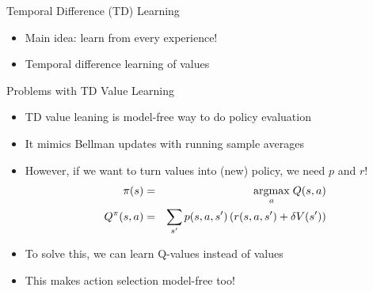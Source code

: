 \documentclass[11pt,aspectratio=169]{beamer}
\begin{document}
  
  \begin{frame}{Temporal Difference (TD) Learning}
   \begin{itemize}[<+->]
   \setlength{\itemsep}{0.7em}
    \item Main idea: learn from every experience!
    \item Temporal difference learning of values
   \end{itemize}
  \end{frame}
  
  
  \begin{frame}{Problems with TD Value Learning}
   \begin{itemize}
   \setlength{\itemsep}{1em}
    \item TD value leaning is model-free way to do policy evaluation
    \item It mimics Bellman updates with running sample averages
    \item However, if we want to turn values into (new) policy, we need $p$ and $r$!
    \begin{eqnarray*}    
     \pi(s) & = &\underset{a}{\operatorname*{argmax}} \; Q(s, a)\\
     Q^\pi(s,a) & = &\sum_{s^\prime}p(s, a, s^\prime) \left(r(s, a, s^\prime) + \delta V(s^\prime)\right)
    \end{eqnarray*}
    \item To solve this, we can learn Q-values instead of values
    \item This makes action selection model-free too!
   \end{itemize}
  \end{frame}
  
\end{document}

